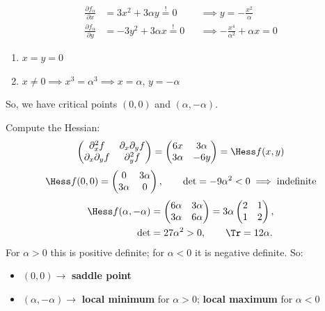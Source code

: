 \begin{exercisesolution}
\[
\begin{aligned}
\frac{\partial f_\alpha}{\partial x} &= 3x^2 + 3\alpha y \overset{!}{=} 0 &&\implies y = -\frac{x^2}{\alpha} \\
\frac{\partial f_\alpha}{\partial y} &= -3y^2 + 3\alpha x \overset{!}{=} 0 &&\implies -\frac{x^4}{\alpha^2} + \alpha x = 0
\end{aligned}
\]
\begin{enumerate}[label=\textbf{\arabic*.}]
  \item $x = y = 0$
  \item $x \neq 0 \implies x^3 = \alpha^3 \implies x = \alpha$, $y = -\alpha$
\end{enumerate}
So, we have critical points $(0,0)$ and $(\alpha, -\alpha)$.

Compute the Hessian:
\[\begin{pmatrix} \partial_x^2 f & \partial_x\partial_y f \\ \partial_x\partial_y f & \partial_y^2 f\end{pmatrix} = \begin{pmatrix} 6x & 3\alpha \\ 3\alpha & -6y \end{pmatrix} = \Hess f(x,y)\]
\[\Hess f(0,0) = \begin{pmatrix} 0 & 3\alpha \\ 3\alpha & 0\end{pmatrix}, \qquad \det = -9\alpha^2 < 0 \implies \text{indefinite}\]
\begin{align*}
\Hess f(\alpha,-\alpha) &= \begin{pmatrix} 6\alpha & 3\alpha \\ 3\alpha & 6\alpha\end{pmatrix}
  = 3\alpha\begin{pmatrix} 2 & 1 \\ 1 & 2\end{pmatrix}, \\
\det &= 27\alpha^2 > 0, \qquad \Tr = 12\alpha.
\end{align*}
For $\alpha > 0$ this is positive definite; for $\alpha < 0$ it is negative definite. So:
\begin{itemize}
  \item $(0,0) \longrightarrow$ \textbf{saddle point}
  \item $(\alpha,-\alpha) \longrightarrow$ \textbf{local minimum} for $\alpha > 0$; \textbf{local
    maximum} for $\alpha < 0$
\end{itemize}
\end{exercisesolution}

